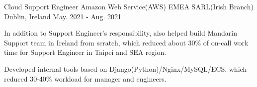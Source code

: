 \begin{cventries}
    \cventry
        {Cloud Support Engineer}
        {Amazon Web Service(AWS) EMEA SARL(Irish Branch)}
        {Dublin, Ireland}
        {May. 2021 - Aug. 2021}
        {   
            \begin{cvitems}
                \item
                    {
                        In addition to Support Engineer's responsibility, also helped build Mandarin Support team in Ireland from scratch, which reduced about 30\% of on-call work time for Support Engineer in Taipei and SEA region.
                    }
                \item
                    {
                        Developed internal tools based on Django(Python)/Nginx/MySQL/ECS, which reduced 30-40\% workload for manager and engineers.
                    }
            \end{cvitems}
        }


\end{cventries}
